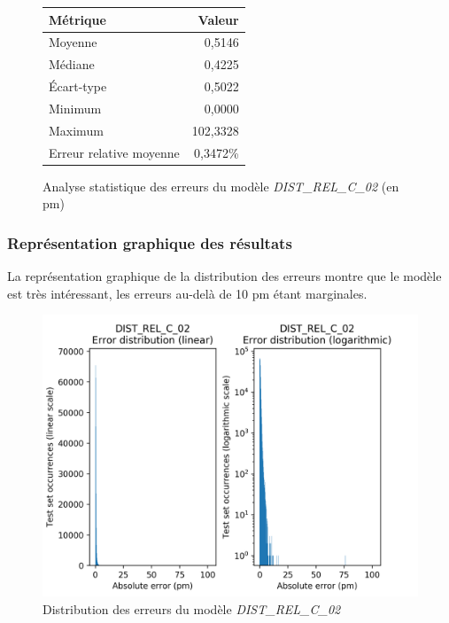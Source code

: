 \begin{figure}[!h]
	\centering
	\begin{tabular}{|l|r|}
		\hline
		\textbf{Métrique} & \textbf{Valeur} \\ \hline
		Moyenne & 0,5146 \\ \hline
		Médiane & 0,4225 \\ \hline
		Écart-type & 0,5022 \\ \hline
		Minimum & 0,0000 \\ \hline
		Maximum & 102,3328\\ \hline
		Erreur relative moyenne & 0,3472\% \\ \hline
	\end{tabular}
	
	\caption{Analyse statistique des erreurs du modèle \emph{DIST\_REL\_C\_02} (en pm)}
\end{figure}

\subsubsection{Représentation graphique des résultats}
\par La représentation graphique de la distribution des erreurs montre que le modèle est très intéressant, les erreurs au-delà de 10 pm étant marginales. \\

\begin{figure}[!h]
	\centering
	
	\includegraphics[scale=0.7]{../figures/DIST_REL_C_02/DIST_REL_C_02_distrib_rmse_val.png}	
	
	\caption{Distribution des erreurs du modèle \emph{DIST\_REL\_C\_02}}
\end{figure}

